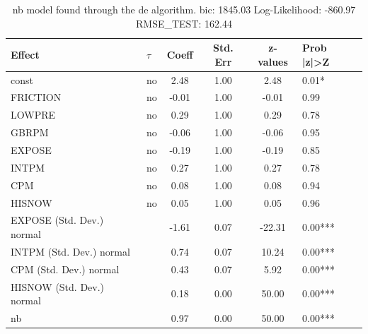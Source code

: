 \begin{table}
	\caption{nb model found through the de algorithm. bic: 1845.03 Log-Likelihood: -860.97 RMSE_TEST: 162.44}
	\begin{center}
		\begin{tabular}{|l|l|c|c|c|l|}
			\hline
			Effect & $\tau$ & Coeff & Std. Err & z-values & Prob |z|>Z \\
			\hline
			const & no & 2.48 & 1.00 & 2.48 & 0.01* \\
			\hline
			FRICTION & no & -0.01 & 1.00 & -0.01 & 0.99 \\
			\hline
			LOWPRE & no & 0.29 & 1.00 & 0.29 & 0.78 \\
			\hline
			GBRPM & no & -0.06 & 1.00 & -0.06 & 0.95 \\
			\hline
			EXPOSE & no & -0.19 & 1.00 & -0.19 & 0.85 \\
			\hline
			INTPM & no & 0.27 & 1.00 & 0.27 & 0.78 \\
			\hline
			CPM & no & 0.08 & 1.00 & 0.08 & 0.94 \\
			\hline
			HISNOW & no & 0.05 & 1.00 & 0.05 & 0.96 \\
			\hline
			EXPOSE (Std. Dev.) normal &  & -1.61 & 0.07 & -22.31 & 0.00*** \\
			\hline
			INTPM (Std. Dev.) normal &  & 0.74 & 0.07 & 10.24 & 0.00*** \\
			\hline
			CPM (Std. Dev.) normal &  & 0.43 & 0.07 & 5.92 & 0.00*** \\
			\hline
			HISNOW (Std. Dev.) normal &  & 0.18 & 0.00 & 50.00 & 0.00*** \\
			\hline
			nb &  & 0.97 & 0.00 & 50.00 & 0.00*** \\
			\hline
		\end{tabular}
	\end{center}
\end{table}